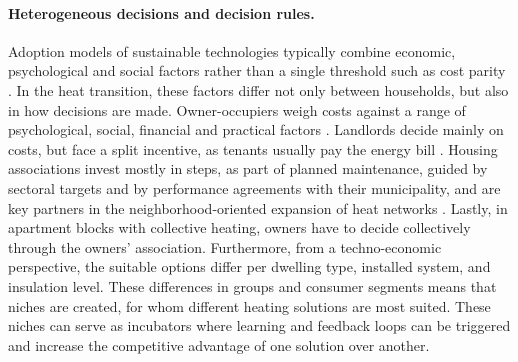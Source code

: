 \documentclass[preprint,12pt,authoryear]{elsarticle}
\begin{document}
\paragraph{Heterogeneous decisions and decision rules.}
Adoption models of sustainable technologies typically combine economic,
psychological and social factors rather than a single threshold such as cost
parity \citep{raoCriticalReviewHeat2025}. In the heat transition, these
factors differ not only between households, but also in how decisions are
made. Owner-occupiers weigh costs against a range of psychological, social,
financial and practical factors \citep{jagerHouseholdHeatPump2025}. Landlords
decide mainly on costs, but face a split incentive, as tenants usually pay
the energy bill \citep{aydinSplitIncentivesEnergy2026}. Housing associations
invest mostly in steps, as part of planned maintenance, guided by sectoral
targets and by performance agreements with their municipality, and are key
partners in the neighborhood-oriented expansion of heat networks
\citep{vanderbentFutureSustainableHousing2022}. Lastly, in apartment blocks
with collective heating,  owners have to decide collectively through the
owners' association. 
Furthermore, from a techno-economic perspective, the suitable options
differ per dwelling type, installed system, and insulation level. These
differences in groups and consumer segments means that niches are created,
for whom different heating solutions are most suited. These niches can serve
as incubators where learning and feedback loops can be triggered and increase
the competitive advantage of one solution over another.
\end{document}
